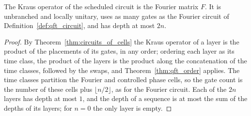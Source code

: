 \begin{theorem}
    \label{thm:qft_parallel}
    \leanok
    The Kraus operator of the scheduled circuit is the Fourier matrix $F$. It is
    unbranched and locally unitary, uses as many gates as the Fourier circuit of
    Definition~\ref{def:qft_circuit}, and has depth at most $2n$.
\end{theorem}
\begin{proof}\leanok
    By Theorem~\ref{thm:circuits_of_cells} the Kraus operator of a layer is the
    product of the placements of its gates, in any order; ordering each layer as its
    time class, the product of the layers is the product along the concatenation of
    the time classes, followed by the swaps, and Theorem~\ref{thm:qft_order} applies.
    The time classes partition the Fourier and controlled phase cells, so the gate
    count is the number of these cells plus $\lfloor n/2\rfloor$, as for the Fourier
    circuit. Each of the $2n$ layers has depth at most $1$, and the depth of a sequence
    is at most the sum of the depths of its layers; for $n=0$ the only layer is empty.
\end{proof}
